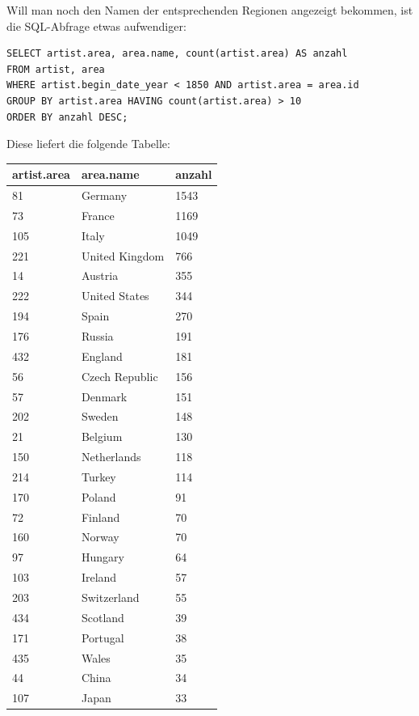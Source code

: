 \documentclass{article}
\begin{document}
	Will man noch den Namen der entsprechenden Regionen angezeigt bekommen, ist die SQL-Abfrage etwas aufwendiger:
	\begin{lstlisting}[style=sql]
SELECT artist.area, area.name, count(artist.area) AS anzahl 
FROM artist, area 
WHERE artist.begin_date_year < 1850 AND artist.area = area.id 
GROUP BY artist.area HAVING count(artist.area) > 10 
ORDER BY anzahl DESC;
	\end{lstlisting}
	Diese liefert die folgende Tabelle:
	\begin{center}
		\begin{longtable}{l|l|l}
			\textbf{artist.area} & \textbf{area.name} & \textbf{anzahl} \\ \hline
			81 & Germany & 1543 \\ \hline
			73 & France & 1169 \\ \hline
			105 & Italy & 1049 \\ \hline
			221 & United Kingdom & 766 \\ \hline
			14 & Austria & 355 \\ \hline
			222 & United States & 344 \\ \hline
			194 & Spain & 270 \\ \hline
			176 & Russia & 191 \\ \hline
			432 & England & 181 \\ \hline
			56 & Czech Republic & 156 \\ \hline
			57 & Denmark & 151 \\ \hline
			202 & Sweden & 148 \\ \hline
			21 & Belgium & 130 \\ \hline
			150 & Netherlands & 118 \\ \hline
			214 & Turkey & 114 \\ \hline
			170 & Poland & 91 \\ \hline
			72 & Finland & 70 \\ \hline
			160 & Norway & 70 \\ \hline
			97 & Hungary & 64 \\ \hline
			103 & Ireland & 57 \\ \hline
			203 & Switzerland & 55 \\ \hline
			434 & Scotland & 39 \\ \hline
			171 & Portugal & 38 \\ \hline
			435 & Wales & 35 \\ \hline
			44 & China & 34 \\ \hline
			107 & Japan & 33 \\ \hline

\end{longtable}
\end{center}
\end{document}
